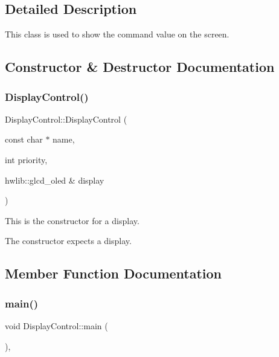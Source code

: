 \subsection{Detailed Description}
This class is used to show the command value on the screen. 

\subsection{Constructor \& Destructor Documentation}
\mbox{\label{class_display_control_a5a24ccc28d6984bda6871ef6d0e4af3f}} 
\subsubsection{\texorpdfstring{Display\+Control()}{DisplayControl()}}
{\footnotesize\ttfamily Display\+Control\+::\+Display\+Control (\begin{DoxyParamCaption}\item[{const char $\ast$}]{name,  }\item[{int}]{priority,  }\item[{hwlib\+::glcd\+\_\+oled \&}]{display }\end{DoxyParamCaption})\hspace{0.3cm}{\ttfamily [inline]}}



This is the constructor for a display. 

The constructor expects a display. 

\subsection{Member Function Documentation}
\mbox{\label{class_display_control_a9707c32249e0a648afc2def818900f30}} 
\subsubsection{\texorpdfstring{main()}{main()}}
{\footnotesize\ttfamily void Display\+Control\+::main (\begin{DoxyParamCaption}{ }\end{DoxyParamCaption})\hspace{0.3cm}{\ttfamily [inline]}, {\ttfamily [override]}}




